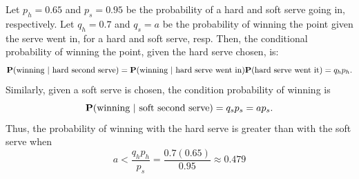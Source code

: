 \documentclass{homework}
\begin{document}
Let $p_h=0.65$ and $p_s=0.95$ be the probability of a hard and soft serve going in, respectively.
Let $q_h=0.7$ and $q_s=a$ be the probability of winning the point given the serve went in,
for a hard and soft serve, resp. Then, the conditional probability of winning the
point, given the hard serve chosen, is:
\begin{equation*}
    {\bf P}(\text{winning } | \text{ hard second serve}) = {\bf P}(\text{winning } | \text{ hard serve went in}) {\bf P}(\text{hard serve went it}) = q_h p_h.
\end{equation*}
Similarly, given a soft serve is chosen, the condition probability of winning is
\begin{equation*}
    {\bf P}(\text{winning } | \text{ soft second serve}) = q_s p_s = a p_s.
\end{equation*}
Thus, the probability of winning with the hard serve is greater than with the soft serve when
\begin{equation*}
    a < \frac{q_h p_h}{p_s} = \frac{0.7(0.65)}{0.95} \approx 0.479
\end{equation*}
\end{document}
